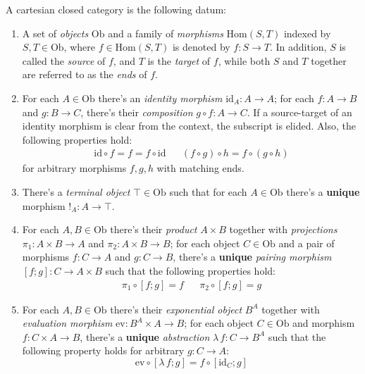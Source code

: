 \begin{definition}\label{ccc}
A cartesian closed category is the following datum:
\begin{enumerate}
\item A set of \textit{objects} $\mathrm{Ob}$ and a
    family of \textit{morphisms} $\mathrm{Hom}(S, T)$
    indexed by $S,T\in\mathrm{Ob}$, where
    $f\in\mathrm{Hom}(S,T)$ is denoted by $f:S\to T$. In
    addition, $S$ is called the \textit{source} of $f$,
    and $T$ is the \textit{target} of $f$, while both $S$
    and $T$ together are referred to as the \textit{ends}
    of $f$.
\item For each $A\in\mathrm{Ob}$ there's an
    \textit{identity morphism} $\mathrm{id}_A: A\to A$;
    for each $f:A\to B$ and $g:B\to C$, there's their
    \textit{composition} $g\circ f:A\to C$. If a
    source-target of an identity morphism is clear from
    the context, the subscript is elided. Also, the
    following properties hold:
    \begin{align*}
        \mathrm{id}\circ f = f = f\circ\mathrm{id} & &
        (f \circ g) \circ h = f \circ (g \circ h)
    \end{align*}
    for arbitrary morphisms $f,g,h$ with matching ends.
\item There's a \textit{terminal object}
    $\top\in\mathrm{Ob}$ such that for each
    $A\in\mathrm{Ob}$ there's a \textbf{unique} morphism
    $!_A:A\to\top$.
\item For each $A,B\in\mathrm{Ob}$ there's their
    \textit{product} $A\times B$ together with
    \textit{projections} $\pi_1:A\times B\to A$ and
    $\pi_2:A\times B\to B$; for each object
    $C\in\mathrm{Ob}$ and a pair of morphisms $f:C\to A$
    and $g:C\to B$, there's a \textbf{unique}
    \textit{pairing morphism} $[f;g]:C\to A\times B$
    such that the following properties hold:
    \begin{align*}
        \pi_1\circ[f;g]=f & & \pi_2\circ[f;g]=g
    \end{align*}
\item For each $A,B\in\mathrm{Ob}$ there's their
    \textit{exponential object} $B^A$ together with
    \textit{evaluation morphism}
    $\mathrm{ev}:B^A\times A\to B$; for each object
    $C\in\mathrm{Ob}$ and morphism $f:C\times A\to B$,
    there's a \textbf{unique} \textit{abstraction}
    $\lambda\,f:C\to B^A$ such that the following
    property holds for arbitrary $g:C\to A$:
    \[
        \mathrm{ev}\circ[\lambda\,f; g]
        = f\circ[\mathrm{id}_C; g]
    \]
\end{enumerate}
\end{definition}

